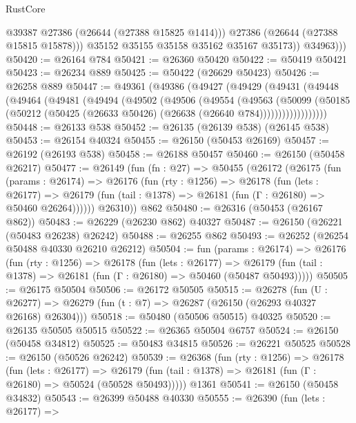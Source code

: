 \begin{lexlean}{RustCore}
\begin{coremodule}
                  @39387
                  @27386
                  (@26644 (@27388 @15825 @1414)))
                @27386
                (@26644 (@27388 @15815 @15878)))
              @35152
              @35155
              @35158
              @35162
              @35167
              @35173))
          @34963)))
@50420 := @26164 @784
@50421 := @26360 @50420
@50422 := @50419 @50421
@50423 := @26234 @889
@50425 := @50422 (@26629 @50423)
@50426 := @26258 @889
@50447 := @49361
    (@49386
      (@49427
        (@49429
          (@49431
            (@49448
              (@49464
                (@49481
                  (@49494
                    (@49502
                      (@49506
                        (@49554
                          (@49563
                            (@50099
                              (@50185
                                (@50212
                                  (@50425 (@26633 @50426) (@26638 (@26640 @784))))))))))))))))))
@50448 := @26133 @538
@50452 := @26135 (@26139 @538) (@26145 @538)
@50453 := @26154 @40324
@50455 := @26150 (@50453 @26169)
@50457 := @26192 (@26193 @538)
@50458 := @26188 @50457
@50460 := @26150 (@50458 @26217)
@50477 := @26149
    (fun (fn : @27) =>
    @50455
      (@26172
        (@26175
          (fun (params : @26174) =>
          @26176
            (fun (rty : @1256) =>
            @26178
              (fun (lets : @26177) =>
              @26179 (fun (tail : @1378) => @26181 (fun (Γ : @26180) => @50460 @26264))))))
        @26310))
    @862
@50480 := @26316 (@50453 (@26167 @862))
@50483 := @26229 (@26230 @862) @40327
@50487 := @26150 (@26221 (@50483 @26238) @26242)
@50488 := @26255 @862
@50493 := @26252 (@26254 @50488 @40330 @26210 @26212)
@50504 := fun (params : @26174) =>
  @26176
    (fun (rty : @1256) =>
    @26178
      (fun (lets : @26177) =>
      @26179 (fun (tail : @1378) => @26181 (fun (Γ : @26180) => @50460 (@50487 @50493)))))
@50505 := @26175 @50504
@50506 := @26172 @50505
@50515 := @26278
    (fun (U : @26277) => @26279 (fun (t : @7) => @26287 (@26150 (@26293 @40327 @26168) @26304)))
@50518 := @50480 (@50506 @50515) @40325
@50520 := @26135 @50505 @50515
@50522 := @26365 @50504 @6757
@50524 := @26150 (@50458 @34812)
@50525 := @50483 @34815
@50526 := @26221 @50525
@50528 := @26150 (@50526 @26242)
@50539 := @26368
    (fun (rty : @1256) =>
    @26178
      (fun (lets : @26177) =>
      @26179 (fun (tail : @1378) => @26181 (fun (Γ : @26180) => @50524 (@50528 @50493)))))
    @1361
@50541 := @26150 (@50458 @34832)
@50543 := @26399 @50488 @40330
@50555 := @26390
    (fun (lets : @26177) =>

\end{coremodule}
\end{lexlean}
